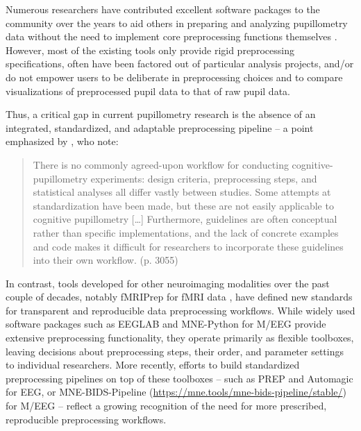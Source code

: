 Numerous researchers have contributed excellent software packages to the community over the years to aid others in preparing and analyzing pupillometry data without the need to implement core preprocessing functions themselves \parencite[e.g.,][]{forbes2020pupillometryr,geller2020gazer,hershman2019chap,kinley2021pupl,tsukahara2020pupillometry}. However, most of the existing tools only provide rigid preprocessing specifications, often have been factored out of particular analysis projects, and/or do not empower users to be deliberate in preprocessing choices and to compare visualizations of preprocessed pupil data to that of raw pupil data.

Thus, a critical gap in current pupillometry research is the absence of an integrated, standardized, and adaptable preprocessing pipeline – a point emphasized by \textcite{mathot2023methods}, who note:

\begin{quote}
There is no commonly agreed-upon workflow for conducting cognitive-pupillometry experiments: design criteria, preprocessing steps, and statistical analyses all differ vastly between studies. Some attempts at standardization have been made, but these are not easily applicable to cognitive pupillometry […] Furthermore, guidelines are often conceptual rather than specific implementations, and the lack of concrete examples and code makes it difficult for researchers to incorporate these guidelines into their own workflow. (p. 3055)
\end{quote}

In contrast, tools developed for other neuroimaging modalities over the past couple of decades, notably fMRIPrep for fMRI data \parencite{esteban2020analysis,esteban2019fmriprep}, have defined new standards for transparent and reproducible data preprocessing workflows. While widely used software packages such as EEGLAB \parencite{delorme2004eeglab} and MNE-Python \parencite{gramfort2013meg} for M/EEG provide extensive preprocessing functionality, they operate primarily as flexible toolboxes, leaving decisions about preprocessing steps, their order, and parameter settings to individual researchers. More recently, efforts to build standardized preprocessing pipelines on top of these toolboxes – such as PREP \parencite{bigdelyshamlo2015prep} and Automagic \parencite{pedroni2019automagic} for EEG, or MNE-BIDS-Pipeline (\url{https://mne.tools/mne-bids-pipeline/stable/}) for M/EEG – reflect a growing recognition of the need for more prescribed, reproducible preprocessing workflows.

